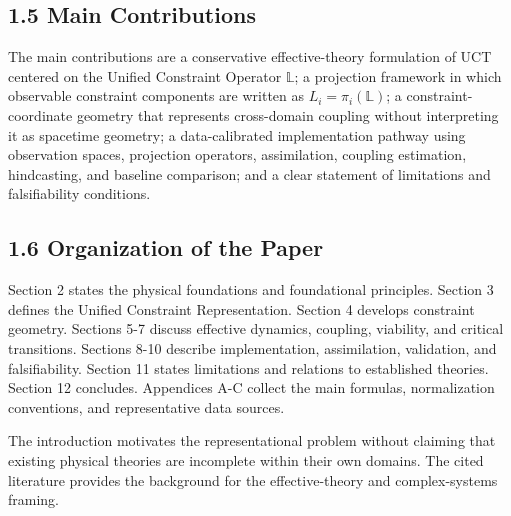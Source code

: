 \subsection{1.5 Main Contributions}

The main contributions are a conservative effective-theory formulation \cite{Wilson1983RG,Goldenfeld1992} of UCT centered on the Unified Constraint Operator \(\mathbb{L}\); a projection framework in which observable constraint components are written as \(L_i=\pi_i(\mathbb{L})\); a constraint-coordinate geometry that represents cross-domain coupling without interpreting it as spacetime geometry; a data-calibrated implementation pathway using observation spaces, projection operators, assimilation, coupling estimation, hindcasting, and baseline comparison; and a clear statement of limitations and falsifiability conditions.

\subsection{1.6 Organization of the Paper}

Section 2 states the physical foundations and foundational principles. Section 3 defines the Unified Constraint Representation. Section 4 develops constraint geometry. Sections 5-7 discuss effective dynamics, coupling, viability, and critical transitions. Sections 8-10 describe implementation, assimilation, validation, and falsifiability. Section 11 states limitations and relations to established theories. Section 12 concludes. Appendices A-C collect the main formulas, normalization conventions, and representative data sources.

The introduction motivates the representational problem without claiming that existing physical theories are incomplete within their own domains. The cited literature provides the background for the effective-theory and complex-systems framing.


